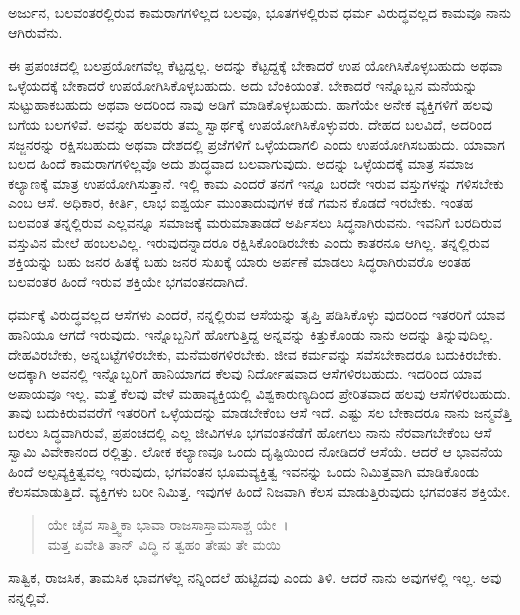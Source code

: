 {\small ಅರ್ಜುನ, ಬಲವಂತರಲ್ಲಿರುವ ಕಾಮರಾಗಗಳಿಲ್ಲದ ಬಲವೂ, ಭೂತಗಳಲ್ಲಿರುವ ಧರ್ಮ ವಿರುದ್ಧವಲ್ಲದ ಕಾಮವೂ ನಾನು ಆಗಿರುವೆನು.}

ಈ ಪ್ರಪಂಚದಲ್ಲಿ ಬಲಪ್ರಯೋಗವೆಲ್ಲ ಕೆಟ್ಟದ್ದಲ್ಲ. ಅದನ್ನು ಕೆಟ್ಟದ್ದಕ್ಕೆ ಬೇಕಾದರೆ ಉಪ ಯೋಗಿಸಿಕೊಳ್ಳಬಹುದು ಅಥವಾ ಒಳ್ಳೆಯದಕ್ಕೆ ಬೇಕಾದರೆ ಉಪಯೋಗಿಸಿಕೊಳ್ಳಬಹುದು. ಅದು ಬೆಂಕಿಯಂತೆ. ಬೇಕಾದರೆ ಇನ್ನೊಬ್ಬನ ಮನೆಯನ್ನು ಸುಟ್ಟುಹಾಕಬಹುದು ಅಥವಾ ಅದರಿಂದ ನಾವು ಅಡಿಗೆ ಮಾಡಿಕೊಳ್ಳಬಹುದು. ಹಾಗೆಯೇ ಅನೇಕ ವ್ಯಕ್ತಿಗಳಿಗೆ ಹಲವು ಬಗೆಯ ಬಲಗಳಿವೆ. ಅವನ್ನು ಹಲವರು ತಮ್ಮ ಸ್ವಾರ್ಥಕ್ಕೆ ಉಪಯೋಗಿಸಿಕೊಳ್ಳುವರು. ದೇಹದ ಬಲವಿದೆ, ಅದರಿಂದ ಸಜ್ಜನರನ್ನು ರಕ್ಷಿಸಬಹುದು ಅಥವಾ ದೇಶದಲ್ಲಿ ಪ್ರಜೆಗಳಿಗೆ ಒಳ್ಳೆಯದಾಗಲಿ ಎಂದು ಉಪಯೋಗಿಸಬಹುದು. ಯಾವಾಗ ಬಲದ ಹಿಂದೆ ಕಾಮರಾಗಗಳಿಲ್ಲವೊ ಅದು ಶುದ್ಧವಾದ ಬಲವಾಗುವುದು. ಅದನ್ನು ಒಳ್ಳೆಯದಕ್ಕೆ ಮಾತ್ರ ಸಮಾಜ ಕಲ್ಯಾಣಕ್ಕೆ ಮಾತ್ರ ಉಪಯೋಗಿಸುತ್ತಾನೆ. ಇಲ್ಲಿ ಕಾಮ ಎಂದರೆ ತನಗೆ ಇನ್ನೂ ಬರದೇ ಇರುವ ವಸ್ತುಗಳನ್ನು ಗಳಿಸಬೇಕು ಎಂಬ ಆಸೆ. ಅಧಿಕಾರ, ಕೀರ್ತಿ, ಲಾಭ ಐಶ್ವರ್ಯ ಮುಂತಾದುವುಗಳ ಕಡೆ ಗಮನ ಕೊಡದೆ ಇರಬೇಕು. ಇಂತಹ ಬಲವಂತ ತನ್ನಲ್ಲಿರುವ ಎಲ್ಲವನ್ನೂ ಸಮಾಜಕ್ಕೆ ಮರುಮಾತಾಡದೆ ಅರ್ಪಿಸಲು ಸಿದ್ಧನಾಗಿರುವನು. ಇವನಿಗೆ ಬರದಿರುವ ವಸ್ತುವಿನ ಮೇಲೆ ಹಂಬಲವಿಲ್ಲ. ಇರುವುದನ್ನಾದರೂ ರಕ್ಷಿಸಿಕೊಂಡಿರಬೇಕು ಎಂದು ಕಾತರನೂ ಆಗಿಲ್ಲ. ತನ್ನಲ್ಲಿರುವ ಶಕ್ತಿಯನ್ನು ಬಹು ಜನರ ಹಿತಕ್ಕೆ ಬಹು ಜನರ ಸುಖಕ್ಕೆ ಯಾರು ಅರ್ಪಣೆ ಮಾಡಲು ಸಿದ್ಧರಾಗಿರುವರೊ ಅಂತಹ ಬಲವಂತರ ಹಿಂದೆ ಇರುವ ಶಕ್ತಿಯೇ ಭಗವಂತನದಾಗಿದೆ.

ಧರ್ಮಕ್ಕೆ ವಿರುದ್ಧವಲ್ಲದ ಆಸೆಗಳು ಎಂದರೆ, ನನ್ನಲ್ಲಿರುವ ಆಸೆಯನ್ನು ತೃಪ್ತಿ ಪಡಿಸಿಕೊಳ್ಳು ವುದರಿಂದ ಇತರರಿಗೆ ಯಾವ ಹಾನಿಯೂ ಆಗದೆ ಇರುವುದು. ಇನ್ನೊಬ್ಬನಿಗೆ ಹೋಗುತ್ತಿದ್ದ ಅನ್ನವನ್ನು ಕಿತ್ತುಕೊಂಡು ನಾನು ಅದನ್ನು ತಿನ್ನುವುದಿಲ್ಲ. ದೇಹವಿರಬೇಕು, ಅನ್ನಬಟ್ಟೆಗಳಿರಬೇಕು, ಮನೆಮಠಗಳಿರಬೇಕು. ಜೀವ ಕರ್ಮವನ್ನು ಸವೆಸಬೇಕಾದರೂ ಬದುಕಿರಬೇಕು. ಅದಕ್ಕಾಗಿ ಅವನಲ್ಲಿ ಇನ್ನೊಬ್ಬರಿಗೆ ಹಾನಿಯಾಗದ ಕೆಲವು ನಿರ್ದೋಷವಾದ ಆಸೆಗಳಿರಬಹುದು. ಇದರಿಂದ ಯಾವ ಅಪಾಯವೂ ಇಲ್ಲ. ಮತ್ತೆ ಕೆಲವು ವೇಳೆ ಮಹಾವ್ಯಕ್ತಿಯಲ್ಲಿ ವಿಶ್ವಕಾರುಣ್ಯದಿಂದ ಪ್ರೇರಿತವಾದ ಹಲವು ಆಸೆಗಳಿರಬಹುದು. ತಾವು ಬದುಕಿರುವವರೆಗೆ ಇತರರಿಗೆ ಒಳ್ಳೆಯದನ್ನು ಮಾಡಬೇಕೆಂಬ ಆಸೆ ಇದೆ. ಎಷ್ಟು ಸಲ ಬೇಕಾದರೂ ನಾನು ಜನ್ಮವೆತ್ತಿ ಬರಲು ಸಿದ್ಧವಾಗಿರುವೆ, ಪ್ರಪಂಚದಲ್ಲಿ ಎಲ್ಲ ಜೀವಿಗಳೂ ಭಗವಂತನೆಡೆಗೆ ಹೋಗಲು ನಾನು ನೆರವಾಗಬೇಕೆಂಬ ಆಸೆ ಸ್ವಾಮಿ ವಿವೇಕಾನಂದ ರಲ್ಲಿತ್ತು. ಲೋಕ ಕಲ್ಯಾಣವೂ ಒಂದು ದೃಷ್ಟಿಯಿಂದ ನೋಡಿದರೆ ಆಸೆಯೆ. ಆದರೆ ಆ ಭಾವನೆಯ ಹಿಂದೆ ಅಲ್ಪವ್ಯಕ್ತಿತ್ವವಲ್ಲ ಇರುವುದು, ಭಗವಂತನ ಭೂಮವ್ಯಕ್ತಿತ್ವ ಇವನನ್ನು ಒಂದು ನಿಮಿತ್ತವಾಗಿ ಮಾಡಿಕೊಂಡು ಕೆಲಸಮಾಡುತ್ತಿದೆ. ವ್ಯಕ್ತಿಗಳು ಬರೀ ನಿಮಿತ್ತ. ಇವುಗಳ ಹಿಂದೆ ನಿಜವಾಗಿ ಕೆಲಸ ಮಾಡುತ್ತಿರುವುದು ಭಗವಂತನ ಶಕ್ತಿಯೇ.

\begin{verse}
ಯೇ ಚೈವ ಸಾತ್ತ್ವಿಕಾ ಭಾವಾ ರಾಜಸಾಸ್ತಾಮಸಾಶ್ಚ ಯೇ~।\\ಮತ್ತ ಏವೇತಿ ತಾನ್ ವಿದ್ಧಿ ನ ತ್ವಹಂ ತೇಷು ತೇ ಮಯಿ 
\end{verse}

{\small ಸಾತ್ವಿಕ, ರಾಜಸಿಕ, ತಾಮಸಿಕ ಭಾವಗಳೆಲ್ಲ ನನ್ನಿಂದಲೆ ಹುಟ್ಟಿದವು ಎಂದು ತಿಳಿ. ಆದರೆ ನಾನು ಅವುಗಳಲ್ಲಿ ಇಲ್ಲ. ಅವು ನನ್ನಲ್ಲಿವೆ.}

